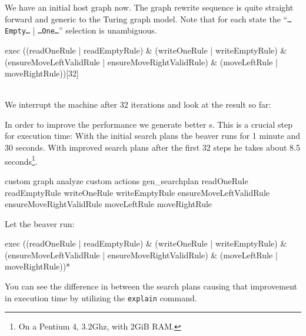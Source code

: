 We have an initial host graph now. The graph rewrite sequence is quite straight forward and generic to the Turing graph model. Note that for each state the ``\texttt{\dots Empty\dots} | \texttt{\dots One\dots}'' selection is unambiguous.
\begin{grshell}[firstnumber=last]
  exec ((readOneRule | readEmptyRule) & (writeOneRule | writeEmptyRule) & (ensureMoveLeftValidRule | ensureMoveRightValidRule) & (moveLeftRule | moveRightRule))[32]

\end{grshell}
\quad\\We interrupt the machine after 32 iterations and look at the result so far:
\begin{center}
\end{center}
In order to improve the performance we generate better s. This is a crucial step for execution time: With the initial search plans the beaver runs for 1 minute and 30 seconds. With improved search plans after the first 32 steps he takes about 8.5 seconds\footnote{On a Pentium 4, 3.2Ghz, with 2GiB RAM.}.
\begin{grshell}[firstnumber=last]
custom graph analyze
custom actions gen_searchplan readOneRule readEmptyRule writeOneRule writeEmptyRule ensureMoveLeftValidRule ensureMoveRightValidRule moveLeftRule moveRightRule

\end{grshell}

Let the beaver run:
\begin{grshell}[firstnumber=last]
  exec ((readOneRule | readEmptyRule) & (writeOneRule | writeEmptyRule) & (ensureMoveLeftValidRule | ensureMoveRightValidRule) & (moveLeftRule | moveRightRule))*
\end{grshell}

You can see the difference in between the search plans causing that improvement in execution time by utilizing the \texttt{explain} command.

